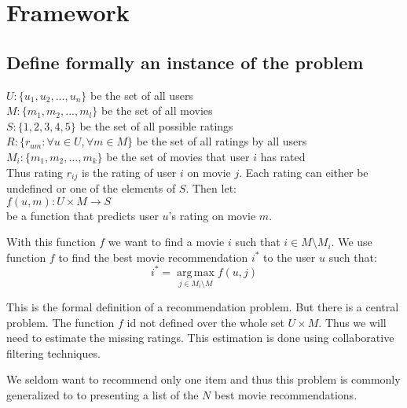 \documentclass[a4paper,11pt]{article}
\begin{document}
\section{Framework}
\subsection{Define formally an instance of the problem}
$U : \{u_1, u_2, ..., u_n\}$ be the set of all users\\
$M : \{m_1, m_2, ..., m_l\}$ be the set of all movies\\
$S : \{1,2,3,4,5\}$ be the set of all possible ratings \\
$R : \{r_{um} : \forall u \in U, \forall m \in M\}$ be the set of all ratings by all users\\
$M_i : \{m_1, m_2, ..., m_k\}$ be the set of movies that user $i$ has rated \\

Thus rating $r_{ij}$ is the rating of user $i$ on movie $j$. Each rating can either be undefined
or one of the elements of $S$. Then let: \\

$f(u,m) : U \times M \to S$ \\

be a function that predicts user $u$'s rating on movie $m$.

With this function $f$ we want to find a movie $i$ such that $i \in M \setminus M_i$.
We use function $f$ to find the best movie recommendation $i^{*}$ to
the user $u$ such that: \\
\[ i^{*} = \operatorname*{arg\,max}_{j \in M_i \setminus M} f(u,j) \]

This is the formal definition of a recommendation problem. But there is a central problem. The
function $f$ id not defined over the whole set $U \times M$. Thus we will need to estimate
the missing ratings. This estimation is done using collaborative filtering techniques.

We seldom want to recommend only one item and thus this problem is commonly generalized to
to presenting a list of the $N$ best movie recommendations.
\end{document}
